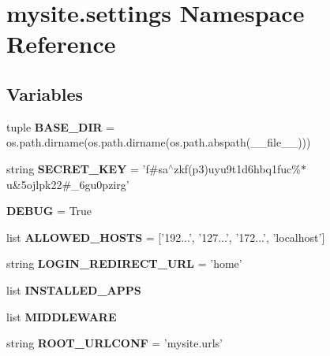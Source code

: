 \hypertarget{namespacemysite_1_1settings}{\section{mysite.\-settings Namespace Reference}
\label{namespacemysite_1_1settings}
}
\subsection*{Variables}
\begin{DoxyCompactItemize}
\item 
\hypertarget{namespacemysite_1_1settings_addb5cd2f2982b7eb7113b40cdfdf0e7d}{tuple {\bfseries B\-A\-S\-E\-\_\-\-D\-I\-R} = os.\-path.\-dirname(os.\-path.\-dirname(os.\-path.\-abspath(\-\_\-\-\_\-file\-\_\-\-\_\-)))}\label{namespacemysite_1_1settings_addb5cd2f2982b7eb7113b40cdfdf0e7d}

\item 
\hypertarget{namespacemysite_1_1settings_ab2aed82d2734b39d5387b22b7a953de5}{string {\bfseries S\-E\-C\-R\-E\-T\-\_\-\-K\-E\-Y} = 'f\#sa$^\wedge$zkf(p3)uyu9t1d6hbq1fuc\%$\ast$u\&5ojlpk22\#\-\_\-6gu0pzirg'}\label{namespacemysite_1_1settings_ab2aed82d2734b39d5387b22b7a953de5}

\item 
\hypertarget{namespacemysite_1_1settings_ae7ae0ac83176d533cc1c1d84862c82bf}{{\bfseries D\-E\-B\-U\-G} = True}\label{namespacemysite_1_1settings_ae7ae0ac83176d533cc1c1d84862c82bf}

\item 
\hypertarget{namespacemysite_1_1settings_ab6f4415a608815b8ca5f84d320437cf8}{list {\bfseries A\-L\-L\-O\-W\-E\-D\-\_\-\-H\-O\-S\-T\-S} = \mbox{[}'192...', '127...', '172...', 'localhost'\mbox{]}}\label{namespacemysite_1_1settings_ab6f4415a608815b8ca5f84d320437cf8}

\item 
\hypertarget{namespacemysite_1_1settings_a626f4fd3c8256437791205c2ce7b0cdd}{string {\bfseries L\-O\-G\-I\-N\-\_\-\-R\-E\-D\-I\-R\-E\-C\-T\-\_\-\-U\-R\-L} = 'home'}\label{namespacemysite_1_1settings_a626f4fd3c8256437791205c2ce7b0cdd}

\item 
list {\bfseries I\-N\-S\-T\-A\-L\-L\-E\-D\-\_\-\-A\-P\-P\-S}
\item 
list {\bfseries M\-I\-D\-D\-L\-E\-W\-A\-R\-E}
\item 
\hypertarget{namespacemysite_1_1settings_ab0a7fa8cdaaccbf5bf874db67cbe507a}{string {\bfseries R\-O\-O\-T\-\_\-\-U\-R\-L\-C\-O\-N\-F} = 'mysite.\-urls'}\label{namespacemysite_1_1settings_ab0a7fa8cdaaccbf5bf874db67cbe507a}


\end{DoxyCompactItemize}
